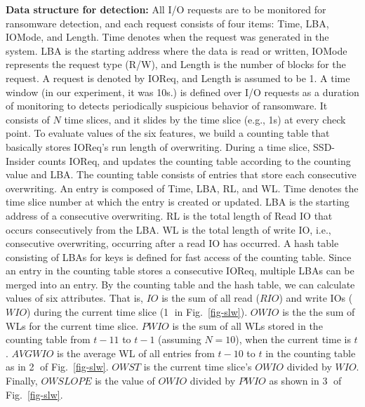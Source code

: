 \documentclass[conference]{IEEEtran}
\newcommand{\eg}{e.g.,\xspace}
\newcommand{\ours}{SSD-Insider}
\begin{document}
{\noindent\bf Data structure for detection:}
All I/O requests are to be monitored for ransomware detection, and each request consists of four items: 
Time, LBA, IOMode, and Length. Time denotes when the request was generated in the system. 
LBA is the starting address where the data is read or written, 
IOMode represents the request type (R/W), 
and Length is the number of blocks for the request. 
A request is denoted by IOReq, and Length is assumed to be 1.  
A time window (in our experiment, it was 10s.) is defined over I/O requests as a duration of monitoring
to detects periodically suspicious behavior of ransomware.
It consists of $N$ time slices, and it slides by the time slice (\eg 1s) at every check point.
To evaluate values of the six features, we build a counting table that basically stores IOReq's run length of overwriting. 
During a time slice, \ours{} counts IOReq, and updates the counting table according to the counting value and LBA.
The counting table consists of entries that store each consecutive overwriting. 
An entry is composed of Time, LBA, RL, and WL. 
Time denotes the time slice number at which the entry is created or updated. 
LBA is the starting address of a consecutive overwriting. 
RL is the total length of Read IO that occurs consecutively from the LBA. 
WL is the total length of write IO, i.e., consecutive overwriting, occurring after a read IO has occurred. 
A hash table consisting of LBAs for keys is defined for fast access of the counting table. 
Since an entry in the counting table stores a consecutive IOReq, multiple LBAs can be merged into an entry.
By the counting table and the hash table, we can calculate values of six attributes. That is,
$IO$ is the sum of all read ($RIO$) and write IOs ($WIO$) during the current time slice 
(\textcircled{1} in Fig.~\ref{fig-slw}). 
$OWIO$ is the the sum of WLs for the current time slice. 
$PWIO$ is the sum of all WLs stored in the counting table from $t-11$ to $t-1$ (assuming $N=10$), 
when the current time is $t$. 
$AVGWIO$ is the average WL of all entries from $t-10$ to $t$ in the counting table 
as in \textcircled{2} of Fig.~\ref{fig-slw}.
$OWST$ is the current time slice's $OWIO$ divided by $WIO$. 
Finally, $OWSLOPE$ is the value of $OWIO$ divided by $PWIO$ as shown in \textcircled{3} of Fig.~\ref{fig-slw}.
\end{document}
